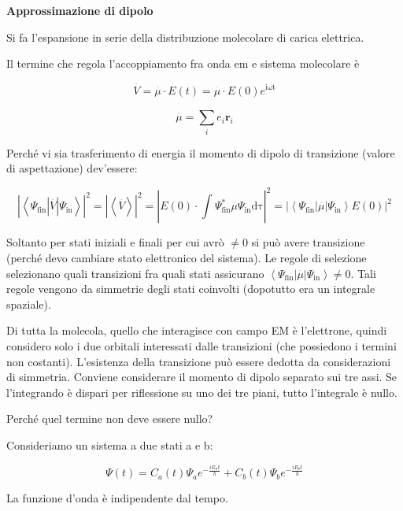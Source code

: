 \textbf{Approssimazione di dipolo}

Si fa l'espansione in serie della distribuzione molecolare di carica
elettrica.

Il termine che regola l'accoppiamento fra onda em e sistema molecolare è

\[\overset{\overline{}}{V} = \overset{\overline{}}{\mu} \cdot E\left( t \right) = \overset{\overline{}}{\mu} \cdot E\left( 0 \right)e^{\text{iωt}}\]

\[\overset{\overline{}}{\mu} = \sum_{i}^{}{e_{i}\mathbf{r}_{i}}\]

Perché vi sia trasferimento di energia il momento di dipolo di
transizione (valore di aspettazione) dev'essere:

\[\left| \left\langle \Psi_{\text{fin}}\left| \overset{\overline{}}{V} \right|\Psi_{\text{in}} \right\rangle \right|^{2} = \left| \left\langle \overset{\overline{}}{V} \right\rangle \right|^{2} = \left| E\left( 0 \right) \cdot \int_{}^{}\Psi_{\text{fin}}^{*}\overset{\overline{}}{\mu}\Psi_{\text{in}}\text{dτ} \right|^{2} = \left| \left\langle \Psi_{\text{fin}}\left| \overset{\overline{}}{\mu} \right|\Psi_{\text{in}} \right\rangle E\left( 0 \right) \right|^{2}\]

Soltanto per stati iniziali e finali per cui avrò \(\neq 0\) si può
avere transizione (perché devo cambiare stato elettronico del sistema).
Le regole di selezione selezionano quali transizioni fra quali stati
assicurano
\(\left\langle \Psi_{\text{fin}}\left| \overset{\overline{}}{\mu} \right|\Psi_{\text{in}} \right\rangle \neq 0\).
Tali regole vengono da simmetrie degli stati coinvolti (dopotutto era un
integrale spaziale).

Di tutta la molecola, quello che interagisce con campo EM è l'elettrone,
quindi considero solo i due orbitali interessati dalle transizioni (che
possiedono i termini non costanti). L'esistenza della transizione può
essere dedotta da considerazioni di simmetria. Conviene considerare il
momento di dipolo separato sui tre assi. Se l'integrando è dispari per
riflessione su uno dei tre piani, tutto l'integrale è nullo.

Perché quel termine non deve essere nullo?

Consideriamo un sistema a due stati a e b:

\[\Psi\left( t \right) = C_{a}\left( t \right)\Psi_{a}e^{- \frac{iE_{a}t}{h}} + C_{b}\left( t \right)\Psi_{b}e^{- \frac{iE_{b}t}{h}}\]

La funzione d'onda è indipendente dal tempo.

